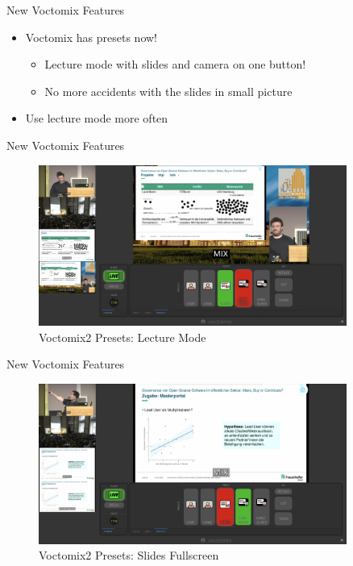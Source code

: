 
\begin{frame}{New Voctomix Features}
	\begin{itemize}
		\item Voctomix has presets now!
		\begin{itemize}
			\item Lecture mode with slides and camera on one button!
			\item No more accidents with the slides in small picture
		\end{itemize}
		\item Use lecture mode more often
	\end{itemize}
\end{frame}

\begin{frame}{New Voctomix Features}
	\begin{figure}
		\centering
		\includegraphics[width=0.9\textwidth]{images/voctomix2-presets-lecture.jpg}
		\caption{Voctomix2 Presets: Lecture Mode}
	\end{figure}
\end{frame}

\begin{frame}{New Voctomix Features}
	\begin{figure}
		\centering
		\includegraphics[width=0.9\textwidth]{images/voctomix2-presets-slides.jpg}
		\caption{Voctomix2 Presets: Slides Fullscreen}
	\end{figure}
\end{frame}
